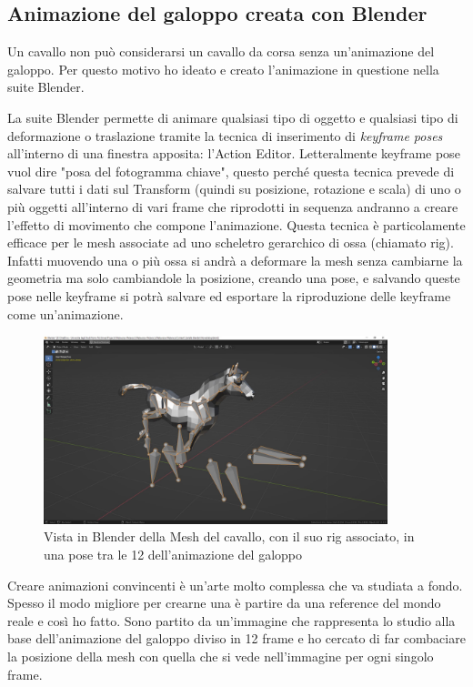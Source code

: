     \subsection{Animazione del galoppo creata con Blender}

    Un cavallo non può considerarsi un cavallo da corsa senza un'animazione del galoppo.
    Per questo motivo ho ideato e creato l'animazione in questione nella suite Blender.

    La suite Blender permette di animare qualsiasi tipo di oggetto e qualsiasi tipo di deformazione o traslazione tramite la tecnica di inserimento di \textit{keyframe poses} all'interno di una finestra apposita: l'Action Editor. 
    Letteralmente keyframe pose vuol dire "posa del fotogramma chiave", questo perché questa tecnica prevede di salvare tutti i dati sul Transform (quindi su posizione, rotazione e scala) di uno o più oggetti all'interno di vari frame che riprodotti in sequenza andranno a creare l'effetto di movimento che compone l'animazione.
    Questa tecnica è particolamente efficace per le mesh associate ad uno scheletro gerarchico di ossa (chiamato rig).
    Infatti muovendo una o più ossa si andrà a deformare la mesh senza cambiarne la geometria ma solo cambiandole la posizione, creando una pose, e salvando queste pose nelle keyframe si potrà salvare ed esportare la riproduzione delle keyframe come un'animazione.

    \begin{figure}[!ht]
        \centering
        \includegraphics[width=10cm]{figure/HorseRig.JPG}
        \caption{Vista in Blender della Mesh del cavallo, con il suo rig associato, in una pose tra le 12 dell'animazione del galoppo}
    \end{figure}

    Creare animazioni convincenti è un'arte molto complessa che va studiata a fondo.
    Spesso il modo migliore per crearne una è partire da una reference del mondo reale e così ho fatto.
    Sono partito da un'immagine che rappresenta lo studio alla base dell'animazione del galoppo diviso in 12 frame e ho cercato di far combaciare la posizione della mesh con quella che si vede nell'immagine per ogni singolo frame.

